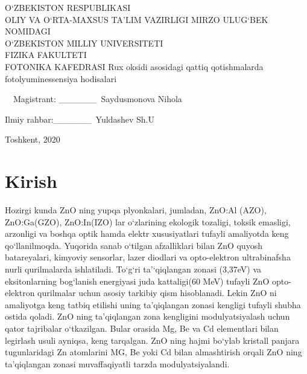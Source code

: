 \documentclass[14pt]{scrarticle}
\begin{document}
	\begin{titlepage}
		\begin{center}
			\large
			O`ZBEKISTON RESPUBLIKASI\\ OLIY VA O`RTA-MAXSUS TA'LIM VAZIRLIGI
			MIRZO ULUG`BEK NOMIDAGI\\O`ZBEKISTON MILLIY UNIVERSITETI\\FIZIKA FAKULTETI\\FOTONIKA KAFEDRASI
			\vspace{0.25cm}
			\vfill
			\Large 			
			\Huge		
			{\Huge Rux oksidi asosidagi qattiq qotishmalarda fotolyuminessensiya hodisalari\\
			}
			\bigskip
		\end{center}
		\vfill
		\huge \ \  Magistrant: \_\_\_\_\_\_\ Saydusmonova Nihola
		
		\huge Ilmiy rahbar:\_\_\_\_\_\_\ Yuldashev Sh.U
		\vfill
		\begin{center}
			Toshkent, 2020
		\end{center}
	\end{titlepage}
	\newpage
	\renewcommand{\contentsname}{Mundarija}
	\tableofcontents
	\newpage
	\section*{Kirish}
	\hspace{1cm}	
	Hozirgi kunda ZnO ning yupqa plyonkalari, jumladan, ZnO:Al (AZO), ZnO:Ga(GZO), ZnO:In(IZO) lar o`zlarining ekologik tozaligi, toksik emasligi, arzonligi va boshqa optik hamda elektr xususiyatlari tufayli amaliyotda keng qo`llanilmoqda. Yuqorida sanab o`tilgan afzalliklari bilan ZnO quyosh batareyalari, kimyoviy sensorlar, lazer diodlari va opto-elektron ultrabinafsha nurli qurilmalarda ishlatiladi. To`g`ri ta'`qiqlangan zonasi  (3,37eV) va eksitonlarning bog`lanish energiyasi juda kattaligi(60 MeV) tufayli ZnO opto-elektron qurilmalar uchun asosiy tarkibiy qism hisoblanadi. Lekin ZnO ni amaliyotga keng tatbiq etilishi uning ta'qiqlangan zonasi kengligi tufayli shubha ostida qoladi. ZnO ning ta'qiqlangan zona kengligini modulyatsiyalash uchun qator tajribalar o`tkazilgan. Bular orasida Mg, Be va Cd elementlari bilan legirlash usuli ayniqsa, keng tarqalgan. ZnO ning hajmi bo`ylab kristall panjara tugunlaridagi Zn atomlarini MG, Be yoki Cd bilan almashtirish  orqali ZnO ning ta'qiqlangan zonasi muvaffaqiyatli tarzda modulyatsiyalandi. 
	
\end{document}
